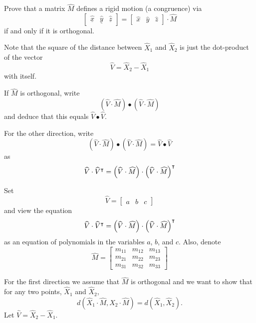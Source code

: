 \documentclass{ximera}
\begin{document}
\begin{problem}
  Prove that a matrix $\hat{M}$ defines a rigid motion (a congruence)
  via
  \[
\begin{bmatrix}
\underline{\hat{x}} & \underline{\hat{y}} & \underline{\hat{z}}%
\end{bmatrix}
=
\begin{bmatrix} \hat{x} & \hat{y} & \hat{z}%
\end{bmatrix}
\cdot\hat{M}
  \]
  if and only if it is orthogonal.

  \begin{hint}
    Note that the square of the distance between $\hat{X}_{1}$ and
    $\hat{X}_{2}$ is just the dot-product of the vector%
    \[
    \hat{V}=\hat{X}_{2}-\hat{X}_{1}%
    \]
    with itself. 
  \end{hint}
  \begin{hint}
    If $\hat{M}$ is orthogonal, write
    \[
    \left(  \hat{V}  \cdot\hat{M} \right) \bullet\left(
    \hat{V}  \cdot\hat{M}\right)
    \]
    and deduce that this equals $\hat{V}\bullet\hat{V}$. 
  \end{hint}
  \begin{hint}
  For the other direction, write 
  \[\left(  \hat{V}  \cdot\hat{M} \right) \bullet\left(
    \hat{V}  \cdot\hat{M}\right)  =\hat{V}\bullet\hat{V}
    \] as
  \[
  \widehat{V}\cdot\widehat{V}^\intercal= \left(  \widehat{V}  \cdot\widehat{M} \right) \cdot\left(
    \widehat{V}  \cdot\widehat{M}\right)^\intercal 
  \]
  \end{hint}
  \begin{hint} Set
    \[
    \hat{V} =
    \begin{bmatrix}
      a & b & c
    \end{bmatrix}
    \]
    and view the equation 
    \[
    \widehat{V}\cdot\widehat{V}^\intercal= \left(  \widehat{V}  \cdot\widehat{M} \right) \cdot\left(
    \widehat{V}  \cdot\widehat{M}\right)^\intercal 
    \]
    as an equation of polynomials in the variables $a$, $b$, and $c$. Also, denote 
    \[
    \hat{M} = 
    \begin{bmatrix}
	m_{11} & m_{12} & m_{13}\\
	m_{21} & m_{22} & m_{23}\\
	m_{31} & m_{32} & m_{33}
\end{bmatrix}
\]
  \end{hint}
  
\begin{freeResponse}
For the first direction we assume that $\hat{M}$ is orthogonal and we want to show that for any two points,  $\hat{X}_{1}$ and $\hat{X}_{2}$,%
\[
   d\left( \hat{X}_{1}  \cdot\hat{M},\hat{X}_{2}
   \cdot\hat{M}\right)  =d\left(  \hat{X}_{1},\hat{X}_{2}\right).
\]
Let $ \hat{V}=\hat{X}_{2}-\hat{X}_{1}$.


\end{freeResponse}
\end{problem}
\end{document}
